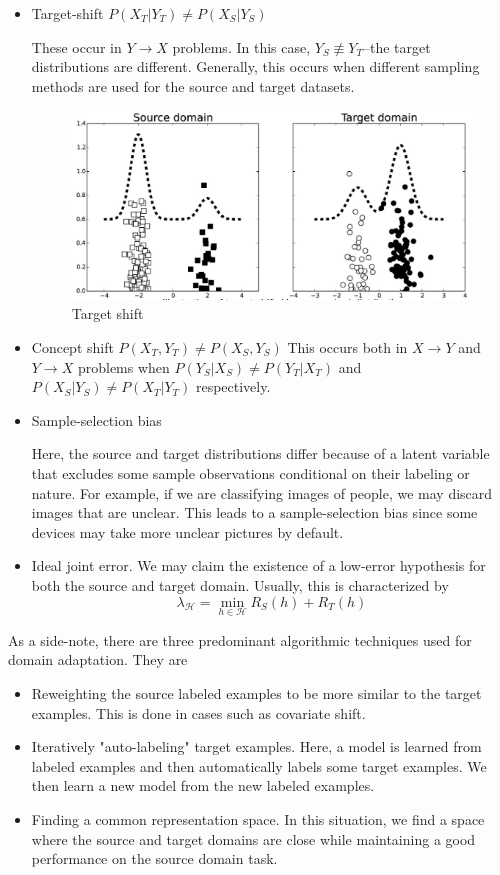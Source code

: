 \begin{itemize}
	
	\item Target-shift
	$P(X_T|Y_T)\neq P(X_S|Y_S)$
	
	These occur in $Y\to X$ problems. In this case, $Y_S\not\equiv Y_T$--the target distributions are different. Generally, this occurs when different sampling methods are used for the source and target datasets.
	
	\begin{figure}
		\centering
		\includegraphics[width=0.7\linewidth]{pictures/target_shift}
		\caption[Target shift illustration]{Target shift}
		\label{fig:targetshift}
	\end{figure}
	
	\item Concept shift
	$P(X_T,Y_T)\neq P(X_S,Y_S)$ This occurs both in $X\to Y$ and $Y\to X$ problems when $P(Y_S|X_S)\neq P(Y_T|X_T)$ and $P(X_S|Y_S)\neq P(X_T|Y_T)$ respectively.
	\item Sample-selection bias
	
	Here, the source and target distributions differ because of a latent variable that excludes some sample observations conditional on their labeling or nature. For example, if we are classifying images of people, we may discard images that are unclear. This leads to a sample-selection bias since some devices may take more unclear pictures by default.
	
	\item Ideal joint error.
	We may claim the existence of a low-error hypothesis for both the source and target domain. Usually, this is characterized by
	\[
	\lambda_{\mathcal{H}}=\min_{h\in \mathcal{H}} R_S(h)+R_T(h)
	\]
	
\end{itemize}

As a side-note, there are three predominant algorithmic techniques used for domain adaptation. They are

\begin{itemize}
	\item Reweighting the source labeled examples to be more similar to the target examples. This is done in cases such as covariate shift.
	\item Iteratively "auto-labeling" target examples. Here, a model is learned from labeled examples and then automatically labels some target examples. We then learn a new model from the new labeled examples.
	\item Finding a common representation space. In this situation, we find a space where the source and target domains are close while maintaining a good performance on the source domain task.
\end{itemize}

